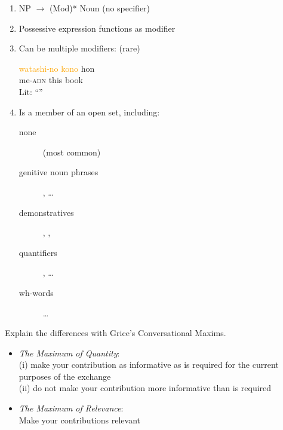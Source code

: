\documentclass[a4paper,landscape,headrule,footrule,dvips]{foils}
\newcommand{\exl}[1]{\textcolor{orange}{#1}}
\begin{document}
\begin{CJK}{UTF8}{min}
\begin{enumerate}\addtolength{\itemsep}{-5mm}
\item NP $\rightarrow$ (Mod)*  Noun \hfill (no specifier)
\item Possessive expression functions as modifier
\item Can be multiple modifiers: (rare) 
 \begin{exe}
    \ex \gll \exl{watashi-no} \exl{kono} hon \\
   me-\textsc{adn} this book \\
    \trans Lit: ``\eng{\exl{my} \exl{this} book}''
  \end{exe}
\item Is a member of an open set, including:
  \begin{description}
  \item[none]  (most common)
  \item[genitive noun phrases],
     \dots
  \item[demonstratives] , , 
  \item[quantifiers] ,  \ldots
  \item[wh-words]  \dots
  \end{description}
\end{enumerate}



Explain the differences with Grice's Conversational Maxims.

\begin{itemize}\addtolength{\itemsep}{-5mm}
  \item \textit{The Maximum of Quantity}:\\
    (i) make your contribution as informative as is required for
    the current purposes of the exchange \\
 (ii) do not make your contribution more informative than is
    required   
  \item \textit{The Maximum of Relevance}:\\
      Make your contributions relevant
\end{itemize}


\end{CJK}
\end{document}
